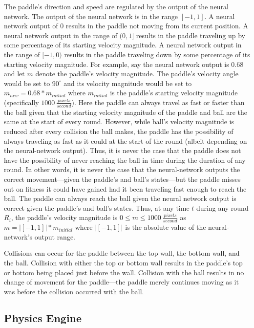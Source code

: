 The paddle's direction and speed are regulated by the output of the neural network. The output of the neural network is in the range $[-1,1]$. A neural network output of $0$ results in the paddle not moving from its current position. A neural network output in the range of $(0,1]$ results in the paddle traveling up by some percentage of its starting velocity magnitude. A neural network output in the range of $[-1,0)$ results in the paddle traveling down by some percentage of its starting velocity magnitude. For example, say the neural network output is $0.68$ and let $m$ denote the paddle's velocity magnitude. The paddle's velocity angle would be set to $90^\circ$ and its velocity magnitude would be set to $m_{new}=0.68*m_{initial}$ where $m_{initial}$ is the paddle's starting velocity magnitude (specifically $1000 \ \frac{pixels}{second}$). Here the paddle can always travel as fast or faster than the ball given that the starting velocity magnitude of the paddle and ball are the same at the start of every round. However, while ball's velocity magnitude is reduced after every collision the ball makes, the paddle has the possibility of always traveling as fast as it could at the start of the round (albeit depending on the neural-network output). Thus, it is never the case that the paddle does not have the possibility of never reaching the ball in time during the duration of any round. In other words, it is never the case that the neural-network outputs the correct movement---given the paddle's and ball's states---but the paddle misses out on fitness it could have gained had it been traveling fast enough to reach the ball. The paddle can always reach the ball given the neural network output is correct given the paddle's and ball's states. Thus, at any time $t$ during any round $R_i$, the paddle's velocity magnitude is $0\leq m \leq 1000 \ \frac{pixels}{second}$ as $m = \left|[-1,1]\right| * m_{initial}$ where $\left|[-1,1]\right|$ is the absolute value of the neural-network's output range.    

Collisions can occur for the paddle between the top wall, the bottom wall, and the ball. Collision with either the top or bottom wall results in the paddle's top or bottom being placed just before the wall. Collision with the ball results in no change of movement for the paddle---the paddle merely continues moving as it was before the collision occurred with the ball.

\subsection{Physics Engine}


